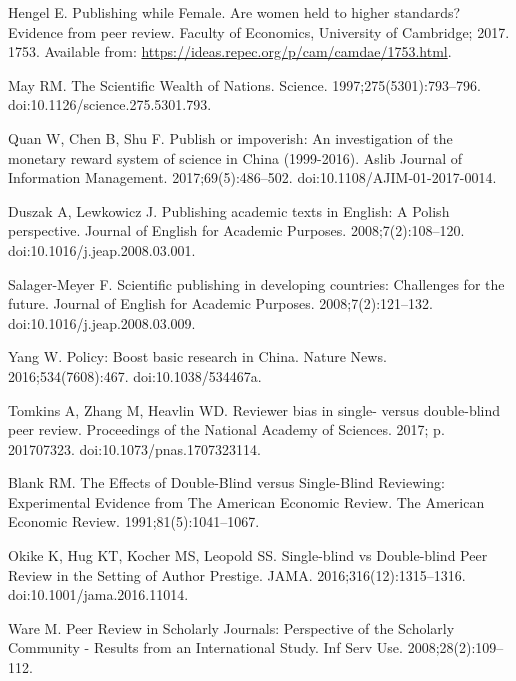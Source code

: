 \documentclass[10pt,letterpaper]{article}
\begin{document}
\begin{thebibliography}{100}
Hengel E.
\newblock Publishing while {Female}. {Are} women held to higher standards?
  {Evidence} from peer review.
\newblock Faculty of Economics, University of Cambridge; 2017. 1753.
\newblock Available from: \url{https://ideas.repec.org/p/cam/camdae/1753.html}.

May RM.
\newblock The {Scientific} {Wealth} of {Nations}.
\newblock Science. 1997;275(5301):793--796.
\newblock doi:{10.1126/science.275.5301.793}.

Quan W, Chen B, Shu F.
\newblock Publish or impoverish: {An} investigation of the monetary reward
  system of science in {China} (1999-2016).
\newblock Aslib Journal of Information Management. 2017;69(5):486--502.
\newblock doi:{10.1108/AJIM-01-2017-0014}.

Duszak A, Lewkowicz J.
\newblock Publishing academic texts in {English}: {A} {Polish} perspective.
\newblock Journal of English for Academic Purposes. 2008;7(2):108--120.
\newblock doi:{10.1016/j.jeap.2008.03.001}.

Salager-Meyer F.
\newblock Scientific publishing in developing countries: {Challenges} for the
  future.
\newblock Journal of English for Academic Purposes. 2008;7(2):121--132.
\newblock doi:{10.1016/j.jeap.2008.03.009}.

Yang W.
\newblock Policy: {Boost} basic research in {China}.
\newblock Nature News. 2016;534(7608):467.
\newblock doi:{10.1038/534467a}.

Tomkins A, Zhang M, Heavlin WD.
\newblock Reviewer bias in single- versus double-blind peer review.
\newblock Proceedings of the National Academy of Sciences. 2017; p. 201707323.
\newblock doi:{10.1073/pnas.1707323114}.

Blank RM.
\newblock The {Effects} of {Double}-{Blind} versus {Single}-{Blind}
  {Reviewing}: {Experimental} {Evidence} from {The} {American} {Economic}
  {Review}.
\newblock The American Economic Review. 1991;81(5):1041--1067.

Okike K, Hug KT, Kocher MS, Leopold SS.
\newblock Single-blind vs {Double}-blind {Peer} {Review} in the {Setting} of
  {Author} {Prestige}.
\newblock JAMA. 2016;316(12):1315--1316.
\newblock doi:{10.1001/jama.2016.11014}.

Ware M.
\newblock Peer {Review} in {Scholarly} {Journals}: {Perspective} of the
  {Scholarly} {Community} - {Results} from an {International} {Study}.
\newblock Inf Serv Use. 2008;28(2):109--112.


\end{thebibliography}
\end{document}
